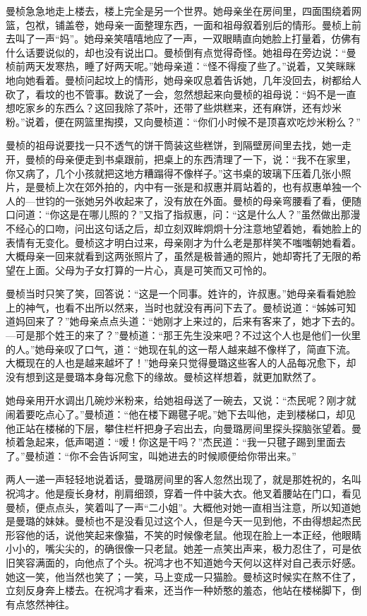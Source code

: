 \par 曼桢急急地走上楼去，楼上完全是另一个世界。她母亲坐在房间里，四面围绕着网篮，包袱，铺盖卷，她母亲一面整理东西，一面和祖母叙着别后的情形。曼桢上前去叫了一声“妈”。她母亲笑嘻嘻地应了一声，一双眼睛直向她脸上打量着，仿佛有什么话要说似的，却也没有说出口。曼桢倒有点觉得奇怪。她祖母在旁边说：“曼桢前两天发寒热，睡了好两天呢。”她母亲道：“怪不得瘦了些了。”说着，又笑眯眯地向她看着。曼桢问起坟上的情形，她母亲叹息着告诉她，几年没回去，树都给人砍了，看坟的也不管事。数说了一会，忽然想起来向曼桢的祖母说：“妈不是一直想吃家乡的东西么？这回我除了茶叶，还带了些烘糕来，还有麻饼，还有炒米粉。”说着，便在网篮里掏摸，又向曼桢道：“你们小时候不是顶喜欢吃炒米粉么？”
\par 曼桢的祖母说要找一只不透气的饼干筒装这些糕饼，到隔壁房间里去找，她一走开，曼桢的母亲便走到书桌跟前，把桌上的东西清理了一下，说：“我不在家里，你又病了，几个小孩就把这地方糟蹋得不像样子。”这书桌的玻璃下压着几张小照片，是曼桢上次在郊外拍的，内中有一张是和叔惠并肩站着的，也有叔惠单独一个人的—世钧的一张她另外收起来了，没有放在外面。曼桢的母亲弯腰看了看，便随口问道：“你这是在哪儿照的？”又指了指叔惠，问：“这是什么人？”虽然做出那漫不经心的口吻，问出这句话之后，却立刻双眸炯炯十分注意地望着她，看她脸上的表情有无变化。曼桢这才明白过来，母亲刚才为什么老是那样笑不嗤嗤朝她看着。大概母亲一回来就看到这两张照片了，虽然是极普通的照片，她却寄托了无限的希望在上面。父母为子女打算的一片心，真是可笑而又可怜的。
\par 曼桢当时只笑了笑，回答说：“这是一个同事。姓许的，许叔惠。”她母亲看看她脸上的神气，也看不出所以然来，当时也就没有再问下去了。曼桢说道：“姊姊可知道妈回来了？”她母亲点点头道：“她刚才上来过的，后来有客来了，她才下去的。—可是那个姓王的来了？”曼桢道：“那王先生没来吧？不过这个人也是他们一伙里的人。”她母亲叹了口气，道：“她现在轧的这一帮人越来越不像样了，简直下流。大概现在的人也是越来越坏了！”她母亲只觉得曼璐这些客人的人品每况愈下，却没有想到这是曼璐本身每况愈下的缘故。曼桢这样想着，就更加默然了。
\par 她母亲用开水调出几碗炒米粉来，给她祖母送了一碗去，又说：“杰民呢？刚才就闹着要吃点心了。”曼桢道：“他在楼下踢毽子呢。”她下去叫他，走到楼梯口，却见他正站在楼梯的下层，攀住栏杆把身子宕出去，向曼璐房间里探头探脑张望着。曼桢着急起来，低声喝道：“嗳！你这是干吗？”杰民道：“我一只毽子踢到里面去了。”曼桢道：“你不会告诉阿宝，叫她进去的时候顺便给你带出来。”
\par 两人一递一声轻轻地说着话，曼璐房间里的客人忽然出现了，就是那姓祝的，名叫祝鸿才。他是瘦长身材，削肩细颈，穿着一件中装大衣。他叉着腰站在门口，看见曼桢，便点点头，笑着叫了一声“二小姐”。大概他对她一直相当注意，所以知道她是曼璐的妹妹。曼桢也不是没看见过这个人，但是今天一见到他，不由得想起杰民形容他的话，说他笑起来像猫，不笑的时候像老鼠。他现在脸上一本正经，他眼睛小小的，嘴尖尖的，的确很像一只老鼠。她差一点笑出声来，极力忍住了，可是依旧笑容满面的，向他点了个头。祝鸿才也不知道她今天何以这样对自己表示好感。她这一笑，他当然也笑了；一笑，马上变成一只猫脸。曼桢这时候实在熬不住了，立刻反身奔上楼去。在祝鸿才看来，还当作一种娇憨的羞态，他站在楼梯脚下，倒有点悠然神往。
